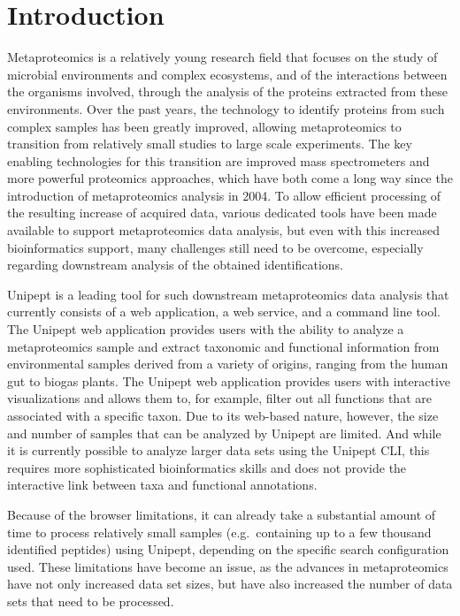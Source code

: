 \hypertarget{introduction-1}{%
\section{Introduction}\label{introduction-1}}

Metaproteomics is a relatively young research field that focuses on the
study of microbial environments and complex ecosystems, and of the
interactions between the organisms involved, through the analysis of the
proteins extracted from these environments. Over the past years, the
technology to identify proteins from such complex samples has been
greatly improved, allowing metaproteomics to transition from relatively
small studies to large scale experiments. The key enabling technologies
for this transition are improved mass spectrometers and more powerful
proteomics approaches, which have both come a long way since the
introduction of metaproteomics analysis in 2004. To allow efficient
processing of the resulting increase of acquired data, various dedicated
tools have been made available to support metaproteomics data analysis,
but even with this increased bioinformatics support, many challenges
still need to be overcome, especially regarding downstream analysis of
the obtained identifications.

Unipept is a leading tool for such downstream metaproteomics data
analysis that currently consists of a web application, a web service,
and a command line tool. The Unipept web application provides users with
the ability to analyze a metaproteomics sample and extract taxonomic and
functional information from environmental samples derived from a variety
of origins, ranging from the human gut to biogas plants. The Unipept web
application provides users with interactive visualizations and allows
them to, for example, filter out all functions that are associated with
a specific taxon. Due to its web-based nature, however, the size and
number of samples that can be analyzed by Unipept are limited. And while
it is currently possible to analyze larger data sets using the Unipept
CLI, this requires more sophisticated bioinformatics skills and does not
provide the interactive link between taxa and functional annotations.

Because of the browser limitations, it can already take a substantial
amount of time to process relatively small samples (e.g.~containing up
to a few thousand identified peptides) using Unipept, depending on the
specific search configuration used. These limitations have become an
issue, as the advances in metaproteomics have not only increased data
set sizes, but have also increased the number of data sets that need to
be processed.

